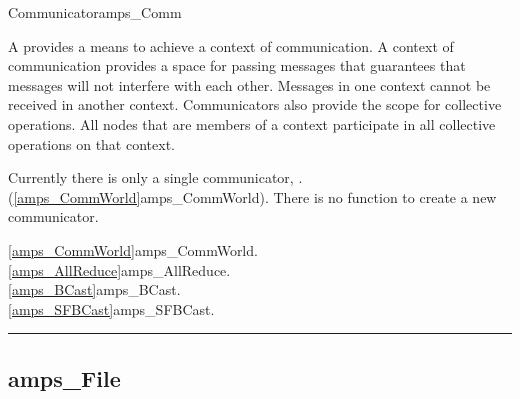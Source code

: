 \begin{deftp}{Communicator}{amps\_Comm}

\DESCRIPTION

A  provides a means to achieve a context of
communication.  A context of communication provides a space for passing
messages that guarantees that messages will not interfere with each other.
  Messages in one context cannot be received in another context.
Communicators also provide the scope for collective operations.  All
nodes that are members of a context participate in all collective
operations on that context.

\NOTES

Currently there is only a single communicator, .
(\vref{amps_CommWorld}{amps\_CommWorld}).  There is no function to create a new
communicator.

\SEEALSO
\vref{amps_CommWorld}{amps\_CommWorld}. \\
\vref{amps_AllReduce}{amps\_AllReduce}. \\
\vref{amps_BCast}{amps\_BCast}. \\
\vref{amps_SFBCast}{amps\_SFBCast}. \\

\end{deftp}


\noindent\rule{\textwidth}{1mm}

\subsection{amps\_File}
\label{amps_File}


